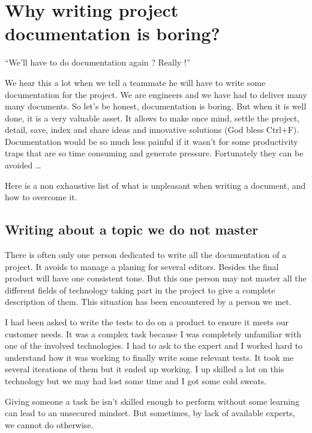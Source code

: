 \setchapterpreamble[u]{\margintoc}
\chapter{Why writing project documentation is boring?}

“We’ll have to do documentation again ? Really !”

We hear this a lot when we tell a teammate he will have to write some documentation for the project. We are engineers and we have had to deliver many many documents. So let’s be honest, documentation is boring. But when it is well done, it is a very valuable asset. It allows to make once mind, settle the project, detail, save, index and share ideas and innovative solutions (God bless Ctrl+F). Documentation would be so much less painful if it wasn’t for some productivity traps that are so time consuming and generate pressure. Fortunately they can be avoided …

Here is a non exhaustive list of what is unpleasant when writing a document, and how to overcome it.

\section{Writing about a topic we do not master}
There is often only one person dedicated to write all the documentation of a project. It avoids to manage a planing for several editors. Besides the final product will have one consistent tone. But this one person may not master all the different fields of technology taking part in the project to give a complete description of them. This situation has been encountered by a person we met.

\begin{kaobox}[frametitle=A former teammate engineer destimonial]
	I had been asked to write the tests to do on a product to ensure it meets our customer needs. It was a complex task because I was completely unfamiliar with one of the involved technologies. I had to ask to the expert and I worked hard to understand how it was working to finally write some relevant tests. It took me several iterations of them but it ended up working. I up skilled a lot on this technology but we may had lost some time and I got some cold sweats.
\end{kaobox}

Giving someone a task he isn’t skilled enough to perform without some learning can lead to an unsecured mindset. But sometimes, by lack of available experts, we cannot do otherwise.

